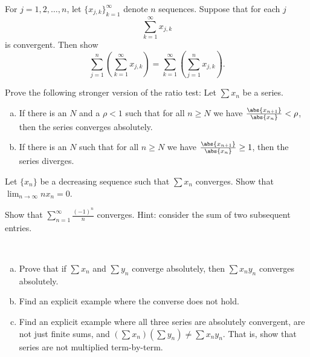 \documentclass[12pt]{book}
\begin{document}
\begin{exercise}
For $j=1,2,\ldots,n$, let $\{ x_{j,k} \}_{k=1}^\infty$ denote $n$
sequences.
Suppose that for each $j$
\begin{equation*}
\sum_{k=1}^\infty x_{j,k}
\end{equation*}
is convergent.
Then show
\begin{equation*}
\sum_{j=1}^n \left( \sum_{k=1}^\infty x_{j,k} \right)
=
\sum_{k=1}^\infty \left( \sum_{j=1}^n x_{j,k} \right) .
\end{equation*}
\end{exercise}

\begin{exercise}
Prove the following stronger version of the ratio test:
Let $\sum x_n$ be a series.
\begin{enumerate}[a)]
\item
If there is an $N$ and a $\rho < 1$ such that for
all $n \geq N$ we have
$\frac{\abs{x_{n+1}}}{\abs{x_n}} < \rho$, then
the series converges absolutely. 
\item
If there is an $N$ such that for
all $n \geq N$ we have
$\frac{\abs{x_{n+1}}}{\abs{x_n}} \geq 1$, then
the series diverges. 
\end{enumerate}
\end{exercise}

\begin{exercise}[Challenging]
Let $\{ x_n \}$ be a decreasing sequence such that $\sum x_n$ converges.
Show
that $\displaystyle \lim_{n\to\infty} n x_n = 0$.
\end{exercise}

\begin{exercise}
Show that $\displaystyle \sum_{n=1}^\infty \frac{{(-1)}^n}{n}$ converges.
Hint: consider the sum of two subsequent entries.
\end{exercise}

\begin{exercise}
{\ }
\begin{enumerate}[a)]
\item Prove that if $\sum x_n$ and $\sum y_n$ converge absolutely, then
$\sum x_ny_n$ converges absolutely.
\item Find an explicit example where the converse does not hold.
\item Find an explicit example where all three series are absolutely convergent,
are not just finite sums,
and $(\sum x_n)(\sum y_n) \not= \sum x_ny_n$.
That is, show that series are
not multiplied term-by-term.
\end{enumerate}
\end{exercise}
\end{document}
